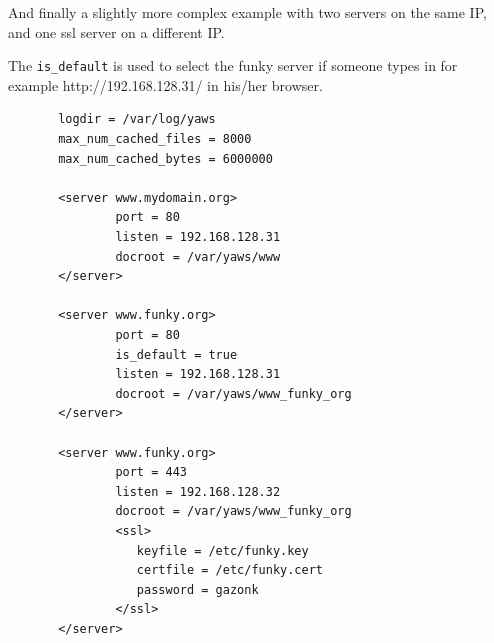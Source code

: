 \documentclass[11pt,oneside,english]{book}
\begin{document}
       And  finally  a  slightly more complex example with
       two servers on the same IP, and one ssl server on a
       different IP.

       The \verb+is_default+ is used to select the funky server if
       someone types in for example http://192.168.128.31/ in his/her
       browser.


\begin{verbatim}
       logdir = /var/log/yaws
       max_num_cached_files = 8000
       max_num_cached_bytes = 6000000

       <server www.mydomain.org>
               port = 80
               listen = 192.168.128.31
               docroot = /var/yaws/www
       </server>

       <server www.funky.org>
               port = 80
               is_default = true
               listen = 192.168.128.31
               docroot = /var/yaws/www_funky_org
       </server>

       <server www.funky.org>
               port = 443
               listen = 192.168.128.32
               docroot = /var/yaws/www_funky_org
               <ssl>
                  keyfile = /etc/funky.key
                  certfile = /etc/funky.cert
                  password = gazonk
               </ssl>
       </server>
\end{verbatim}
\end{document}

